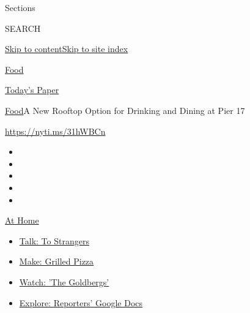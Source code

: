 Sections

SEARCH

\protect\hyperlink{site-content}{Skip to
content}\protect\hyperlink{site-index}{Skip to site index}

\href{https://www.nytimes3xbfgragh.onion/section/food}{Food}

\href{https://myaccount.nytimes3xbfgragh.onion/auth/login?response_type=cookie\&client_id=vi}{}

\href{https://www.nytimes3xbfgragh.onion/section/todayspaper}{Today's
Paper}

\href{/section/food}{Food}\textbar{}A New Rooftop Option for Drinking
and Dining at Pier 17

\url{https://nyti.ms/31hWBCn}

\begin{itemize}
\item
\item
\item
\item
\item
\end{itemize}

\href{https://www.nytimes3xbfgragh.onion/spotlight/at-home?action=click\&pgtype=Article\&state=default\&region=TOP_BANNER\&context=at_home_menu}{At
Home}

\begin{itemize}
\tightlist
\item
  \href{https://www.nytimes3xbfgragh.onion/2020/08/03/well/family/the-benefits-of-talking-to-strangers.html?action=click\&pgtype=Article\&state=default\&region=TOP_BANNER\&context=at_home_menu}{Talk:
  To Strangers}
\item
  \href{https://www.nytimes3xbfgragh.onion/2020/08/01/at-home/coronavirus-make-pizza-on-a-grill.html?action=click\&pgtype=Article\&state=default\&region=TOP_BANNER\&context=at_home_menu}{Make:
  Grilled Pizza}
\item
  \href{https://www.nytimes3xbfgragh.onion/2020/07/31/arts/television/goldbergs-abc-stream.html?action=click\&pgtype=Article\&state=default\&region=TOP_BANNER\&context=at_home_menu}{Watch:
  'The Goldbergs'}
\item
  \href{https://www.nytimes3xbfgragh.onion/interactive/2020/at-home/even-more-reporters-editors-diaries-lists-recommendations.html?action=click\&pgtype=Article\&state=default\&region=TOP_BANNER\&context=at_home_menu}{Explore:
  Reporters' Google Docs}
\end{itemize}


